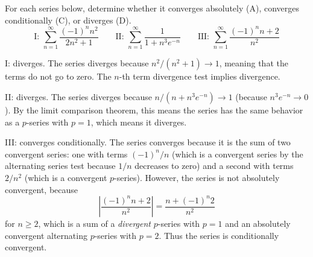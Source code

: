 \documentclass{ximera}
\begin{document}
\begin{question}%

For each series below, determine whether it converges absolutely (A), converges conditionally (C), or diverges (D).  \[\text{I: } \sum_{n = 1}^\infty\frac{(-1)^n n^2}{2 n^2+1} \qquad \text{II: } \sum_{n = 1}^\infty\frac{1}{1 + n^3 e^{-n}} \qquad \text{III: } \sum_{n = 1}^\infty\frac{(-1)^n n + 2}{n^2}\]
\begin{multiplechoice}
\end{multiplechoice}
\begin{feedback}
I: diverges. The series diverges because \(n^2/(n^2+1) \rightarrow 1\), meaning that the terms do not go to zero. The \(n\)-th term divergence test implies divergence.

II: diverges. The series diverges because \(n / (n + n^3 e^{-n}) \rightarrow 1\) (because \(n^3 e^{-n} \rightarrow 0\)). By the limit comparison theorem, this means the series has the same behavior as a \(p\)-series with \(p=1\), which means it diverges.

III: converges conditionally. The series converges because it is the sum of two convergent series: one with terms \((-1)^n / n\) (which is a convergent series by the alternating series test because \(1/n\) decreases to zero) and a second with terms \(2/n^2\) (which is a convergent \(p\)-series). However, the series is not absolutely convergent, because \[ \left| \frac{(-1)^n n + 2}{n^2} \right| = \frac{n + (-1)^n2}{n^2}\] for \(n \geq 2\), which is a sum of a {\it divergent} \(p\)-series with \(p=1\) and an absolutely convergent alternating \(p\)-series with \(p=2\). Thus the series is conditionally convergent.
\end{feedback}

\end{question}
\end{document}
